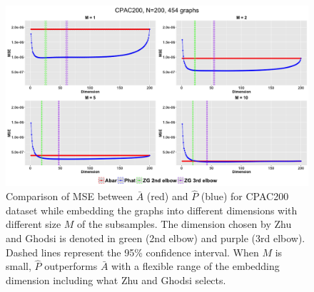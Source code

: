 \begin{figure}[!htb]
\centering
\includegraphics[width=14cm]{CPAC200.png}
\caption{Comparison of MSE between $\bar{A}$ (red) and $\hat{P}$ (blue) for CPAC200 dataset while embedding the graphs into different dimensions with different size $M$ of the subsamples. The dimension chosen by Zhu and Ghodsi is denoted in green (2nd elbow) and purple (3rd elbow). Dashed lines represent the 95\% confidence interval.  When $M$ is small, $\hat{P}$ outperforms $\bar{A}$ with a flexible range of the embedding dimension including what Zhu and Ghodsi selects.}
\label{fig:CPAC200}
\end{figure}





\newpage


